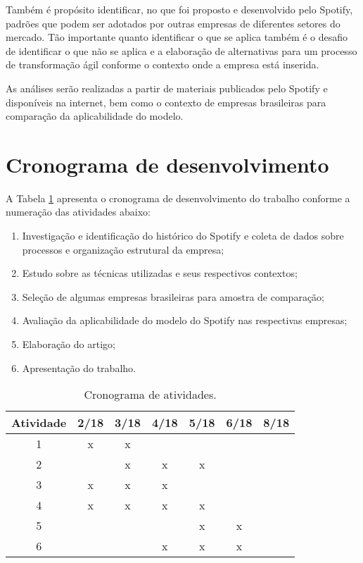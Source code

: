 \documentclass[11pt,a4paper]{article}
\begin{document}
Também é propósito identificar, no que foi proposto e desenvolvido pelo Spotify, padrões que podem ser adotados por outras empresas de diferentes setores do mercado. Tão importante quanto identificar o que se aplica também é o desafio de identificar o que não se aplica e a elaboração de alternativas para um processo de transformação ágil conforme o contexto onde a empresa está inserida.

As análises serão realizadas a partir de materiais publicados pelo Spotify e disponíveis na internet, bem como o contexto de empresas brasileiras para comparação da aplicabilidade do modelo.

\section{Cronograma de desenvolvimento}\label{sec:cronograma}

A Tabela \ref{tab:cronograma} apresenta o cronograma de desenvolvimento do trabalho conforme a numeração das atividades abaixo:
\begin{enumerate}
	\item Investigação e identificação do histórico do Spotify	e coleta de dados sobre processos e organização estrutural da empresa;
	\item Estudo sobre as técnicas utilizadas e seus respectivos contextos; 
	\item Seleção de algumas empresas brasileiras para amostra de comparação;
	\item Avaliação da aplicabilidade do modelo do Spotify nas respectivas empresas;
	\item Elaboração do artigo;
	\item Apresentação do trabalho.
\end{enumerate}

\begin{table}[ht]
\begin{center}
	\caption{Cronograma de atividades. \label{tab:cronograma}}
		\begin{tabular}{|c|c|c|c|c|c|c|}
			\hline			
			 \bf Atividade & \bf 2/18 & \bf 3/18 & \bf 4/18 & \bf 5/18 & \bf 6/18 & \bf 8/18  \\	\hline \hline
					 1 & x & x &   &   &   &   \\ \hline
					 2 &   & x & x & x &   &   \\ \hline
					 3 & x & x & x &   &   &   \\ \hline
					 4 & x & x & x & x &   &   \\ \hline
					 5 &   &   &   & x & x &   \\ \hline
					 6 &   &   & x & x & x &   \\ \hline
		\end{tabular}
		\end{center}		
\end{table}

\renewcommand\refname{Referências}
{\small


}
\end{document}
